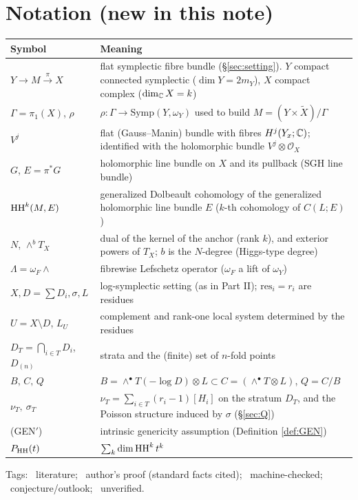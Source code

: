 \section{Notation (new in this note)}\label{sec:notation}
\begin{longtable}{>{\raggedright\arraybackslash}p{3.8cm}>{\raggedright\arraybackslash}p{11.2cm}}
\toprule Symbol & Meaning\\ \midrule\endhead
$Y\to M\xrightarrow{\pi} X$ & flat symplectic fibre bundle (\S\ref{sec:setting}). $Y$ compact connected symplectic ($\dim Y=2m_Y$), $X$ compact complex ($\dim_\mathbb C X=k$)\\
$\Gamma=\pi_1(X)$, $\rho$ & $\rho:\Gamma\to\mathrm{Symp}(Y,\omega_Y)$ used to build $M=(Y\times\tilde X)/\Gamma$\\
$V^j$ & flat (Gauss--Manin) bundle with fibres $H^j(Y_x;\mathbb C)$; identified with the holomorphic bundle $V^j\otimes\mathcal O_X$\\
$G$, $E=\pi^*G$ & holomorphic line bundle on $X$ and its pullback (SGH line bundle)\\
$\mathrm{HH}^k(M,E)$ & generalized Dolbeault cohomology of the generalized holomorphic line bundle $E$ ($k$-th cohomology of $C(L;E)$)\\
$N$, $\wedge^bT_X$ & dual of the kernel of the anchor (rank $k$), and exterior powers of $T_X$; $b$ is the $N$-degree (Higgs-type degree)\\
$\Lambda=\omega_F\wedge$ & fibrewise Lefschetz operator ($\omega_F$ a lift of $\omega_Y$)\\
$X,D=\sum D_i,\sigma,L$ & log-symplectic setting (as in Part II); $\mathrm{res}_i=r_i$ are residues\\
$U=X\setminus D$, $L_U$ & complement and rank-one local system determined by the residues\\
$D_T=\bigcap_{i\in T}D_i$, $D_{(n)}$ & strata and the (finite) set of $n$-fold points\\
$B,\,C,\,Q$ & $B=\wedge^\bullet T(-\log D)\otimes L\subset C=(\wedge^\bullet T\otimes L)$, $Q=C/B$\\
$\nu_T,\ \sigma_T$ & $\nu_T=\sum_{i\in T}(r_i-1)[H_i]$ on the stratum $D_T$, and the Poisson structure induced by $\sigma$ (\S\ref{sec:Q})\\
(GEN$'$) & intrinsic genericity assumption (Definition \ref{def:GEN})\\
$P_{\mathrm{HH}}(t)$ & $\sum_k\dim\mathrm{HH}^k\,t^k$\\
\bottomrule
\end{longtable}
\noindent Tags: \tC\ literature; \tP\ author's proof (standard facts cited); \tV\ machine-checked; \tK\ conjecture/outlook; \tQ\ unverified.

